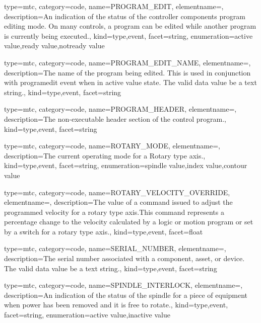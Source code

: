 {
  type=mtc,
  category=code,
  name={PROGRAM\_EDIT},
  elementname=,
  description={An indication of the status of the \gls{controller} components program editing mode. \newline On many controls, a program can be edited while another program is currently being executed.},
  kind={type,event},
  facet={\gls{string}},
  enumeration={\gls{active value},\gls{ready value},\gls{notready value}}
}


{
  type=mtc,
  category=code,
  name={PROGRAM\_EDIT\_NAME},
  elementname=,
  description={The name of the program being edited. \newline This is used in conjunction with \gls{programedit event} when in \gls{active value} state. \newline The \gls{valid data value} \must be a text string.},
  kind={type,event},
  facet={\gls{string}}
}


{
  type=mtc,
  category=code,
  name={PROGRAM\_HEADER},
  elementname=,
  description={The non-executable header section of the control program.},
  kind={type,event},
  facet={\gls{string}}
}


{
  type=mtc,
  category=code,
  name={ROTARY\_MODE},
  elementname=,
  description={The current operating mode for a Rotary type axis.},
  kind={type,event},
  facet={\gls{string}},
  enumeration={\gls{spindle value},\gls{index value},\gls{contour value}}
}


{
  type=mtc,
  category=code,
  name={ROTARY\_VELOCITY\_OVERRIDE},
  elementname=,
  description={The value of a command issued to adjust the programmed velocity for a \gls{rotary} type axis.This command represents a percentage change to the velocity calculated by a logic or motion program or set by a switch for a \gls{rotary} type axis.},
  kind={type,event},
  facet={\gls{float}}
}


{
  type=mtc,
  category=code,
  name={SERIAL\_NUMBER},
  elementname=,
  description={The serial number associated with a \gls{component}, \gls{asset}, or \gls{device}. The \gls{valid data value} \must be a text string.},
  kind={type,event},
  facet={\gls{string}}
}


{
  type=mtc,
  category=code,
  name={SPINDLE\_INTERLOCK},
  elementname=,
  description={An indication of the status of the spindle for a piece of equipment when power has been removed and it is free to rotate.},
  kind={type,event},
  facet={\gls{string}},
  enumeration={\gls{active value},\gls{inactive value}}
}



